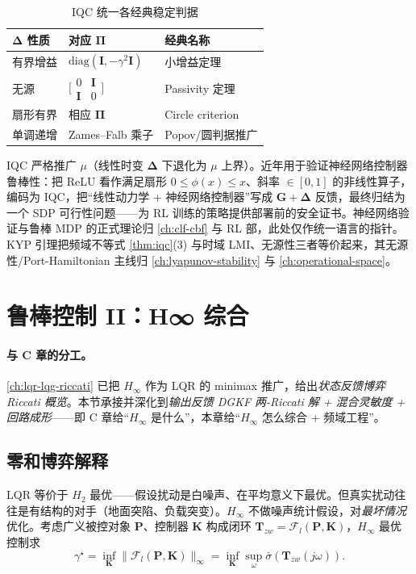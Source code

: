 \begin{table}[H]\centering\small
\caption{IQC 统一各经典稳定判据}
\label{tab:iqc}
\begin{tabular}{lll}
\toprule
$\boldsymbol\Delta$ 性质 & 对应 $\boldsymbol\Pi$ & 经典名称 \\
\midrule
有界增益 & $\mathrm{diag}(\mathbf I,-\gamma^2\mathbf I)$ & 小增益定理 \\
无源 & $\big[\begin{smallmatrix}0&\mathbf I\\\mathbf I&0\end{smallmatrix}\big]$ & Passivity 定理 \\
扇形有界 & 相应 $\boldsymbol\Pi$ & Circle criterion \\
单调递增 & Zames--Falb 乘子 & Popov/圆判据推广 \\
\bottomrule
\end{tabular}
\end{table}

IQC 严格推广 $\mu$（线性时变 $\boldsymbol\Delta$ 下退化为 $\mu$ 上界）。近年用于验证神经网络控制器鲁棒性：把 ReLU 看作满足扇形 $0\le\phi(x)\le x$、斜率 $\in[0,1]$ 的非线性算子，编码为 IQC，把“线性动力学 + 神经网络控制器”写成 $\mathbf G+\boldsymbol\Delta$ 反馈，最终归结为一个 SDP 可行性问题——为 RL 训练的策略提供部署前的安全证书。神经网络验证与鲁棒 MDP 的正式理论归 \cref{ch:clf-cbf} 与 RL 部，此处仅作统一语言的指针。KYP 引理把频域不等式 \cref{thm:iqc}(3) 与时域 LMI、无源性三者等价起来，其无源性/Port-Hamiltonian 主线归 \cref{ch:lyapunov-stability} 与 \cref{ch:operational-space}。

\section{鲁棒控制 II：H∞ 综合}
\label{sec:hinf-synth}

\paragraph{与 C 章的分工。}
\cref{ch:lqr-lqg-riccati} 已把 $H_\infty$ 作为 LQR 的 minimax 推广，给出\emph{状态反馈博弈 Riccati 概览}。本节承接并深化到\emph{输出反馈 DGKF 两-Riccati 解 + 混合灵敏度 + 回路成形}——即 C 章给“$H_\infty$ 是什么”，本章给“$H_\infty$ 怎么综合 + 频域工程”。

\subsection{零和博弈解释}
LQR 等价于 $H_2$ 最优——假设扰动是白噪声、在平均意义下最优。但真实扰动往往是有结构的对手（地面突陷、负载突变）。$H_\infty$ 不做噪声统计假设，对\emph{最坏情况}优化。考虑广义被控对象 $\mathbf P$、控制器 $\mathbf K$ 构成闭环 $\mathbf T_{zw}=\mathcal F_l(\mathbf P,\mathbf K)$，$H_\infty$ 最优控制求
\begin{equation}
  \gamma^\star=\inf_{\mathbf K}\|\mathcal F_l(\mathbf P,\mathbf K)\|_\infty=\inf_{\mathbf K}\sup_\omega\bar\sigma(\mathbf T_{zw}(j\omega)).
\end{equation}

